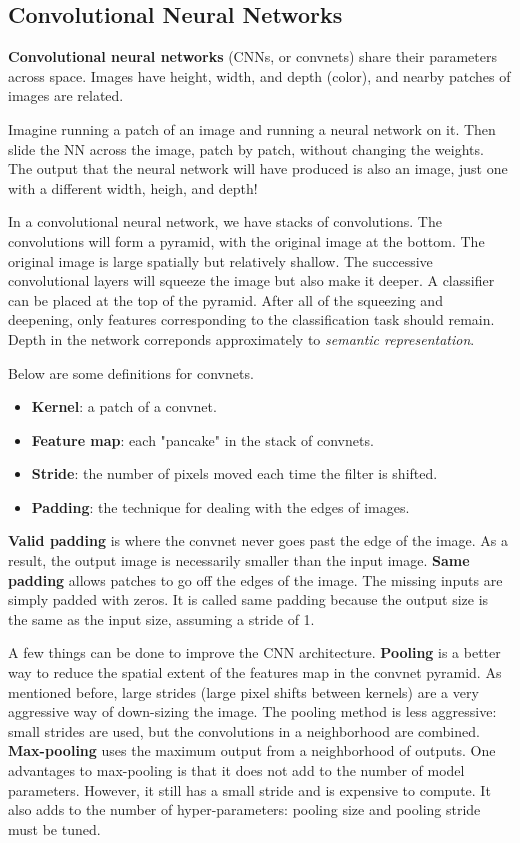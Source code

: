 \subsection{Convolutional Neural Networks} 

\textbf{Convolutional neural networks} (CNNs, or convnets) share their parameters across space. Images have height, width, and depth (color), and nearby patches of images are related. 

Imagine running a patch of an image and running a neural network on it. Then slide the NN across the image, patch by patch, without changing the weights. The output that the neural network will have produced is also an image, just one with a different width, heigh, and depth!

In a convolutional neural network, we have stacks of convolutions. The convolutions will form a pyramid, with the original image at the bottom. The original image is large spatially but relatively shallow. The successive convolutional layers will squeeze the image but also make it deeper. A classifier can be placed at the top of the pyramid. After all of the squeezing and deepening, only features corresponding to the classification task should remain. Depth in the network correponds approximately to \textit{semantic representation}.

Below are some definitions for convnets. 

\begin{itemize}
	\item \textbf{Kernel}: a patch of a convnet. 
	\item \textbf{Feature map}: each "pancake" in the stack of convnets. 
	\item \textbf{Stride}: the number of pixels moved each time the filter is shifted. 
	\item \textbf{Padding}: the technique for dealing with the edges of images.
\end{itemize}

\textbf{Valid padding} is where the convnet never goes past the edge of the image. As a result, the output image is necessarily smaller than the input image. \textbf{Same padding} allows patches to go off the edges of the image. The missing inputs are simply padded with zeros. It is called same padding because the output size is the same as the input size, assuming a stride of 1. 

A few things can be done to improve the CNN architecture. \textbf{Pooling} is a better way to reduce the spatial extent of the features map in the convnet pyramid. As mentioned before, large strides (large pixel shifts between kernels) are a very aggressive way of down-sizing the image. The pooling method is less aggressive: small strides are used, but the convolutions in a neighborhood are combined. \textbf{Max-pooling} uses the maximum output from a neighborhood of outputs. One advantages to max-pooling is that it does not add to the number of model parameters. However, it still has a small stride and is expensive to compute. It also adds to the number of hyper-parameters: pooling size and pooling stride must be tuned. 

